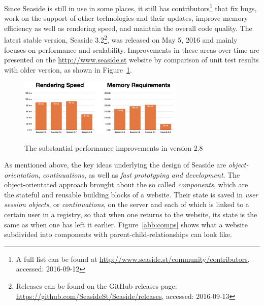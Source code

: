 \documentclass[a4paper,12pt,pagesize,headsepline,titlepage]{scrartcl}
\begin{document}
Since Seaside is still in use in some places, it still has contributors\footnote{A full list can be found at \url{http://www.seaside.st/community/contributors}, accessed: 2016-09-12} that fix bugs, work on the support of other technologies and their updates, improve memory efficiency as well as rendering speed, and maintain the overall code quality. 
The latest stable version, Seaside 3.2\footnote{Releases can be found on the GitHub releases page: \url{https://github.com/SeasideSt/Seaside/releases}, accessed: 2016-09-13}, was released on May 5, 2016 and mainly focuses on performance and scalability. Improvements in these areas over time are presented on the \url{http://www.seaside.st} website by comparison of unit test results with older version, as shown in Figure~\ref{fig:performance}.

\begin{figure}[hbp]
\begin{center}
\includegraphics*[width=0.7\textwidth]{images/performance.png}\\
\caption{The substantial performance improvements in version 2.8}
\label{fig:performance}
\end{center}
\end{figure}

As mentioned above, the key ideas underlying the design of Seaside are \emph{object-orientation}, \emph{continuations}, as well as \emph{fast prototyping and development}.
The object-orientated approach brought about the so called \emph{components}, which are the stateful and reusable building  blocks of a website. Their state is saved in \emph{user session objects}, or \emph{continuations}, on the server and each of which is linked to a certain user in a registry, so that when one returns to the website, its state is the same as when one has left it earlier. Figure~\ref{abb:comps} shows what a website subdivided into components with parent-child-relationships can look like.
\end{document}
